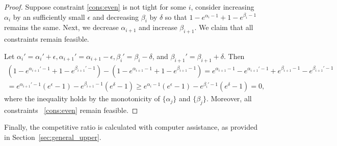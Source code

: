 \begin{proof}
Suppose constraint \eqref{cons:even} is not tight for some $i$, consider increasing $\alpha_i$ by an sufficiently small $\epsilon$ and decreasing $\beta_i$ by $\delta$ so that 
$1-e^{\alpha_i-1} + 1-e^{\beta_i-1}$ remains the same. Next, we decrease $\alpha_{i+1}$ and increase $\beta_{i+1}$. We claim that all constraints remain feasible.

Let $\alpha_i' = \alpha_i' + \epsilon, \alpha_{i+1}' = \alpha_{i+1} - \epsilon, \beta_i'=\beta_i - \delta$, and $\beta_{i+1}' = \beta_{i+1} + \delta$.
Then 
\begin{multline*}
\left(1-e^{\alpha_{i+1}'-1} + 1-e^{\beta_{i+1}'-1} \right) - \left(1-e^{\alpha_{i+1}-1} + 1-e^{\beta_{i+1}-1} \right) = e^{\alpha_{i+1}-1}-e^{\alpha_{i+1}'-1} + e^{\beta_{i+1}-1} - e^{\beta_{i+1}'-1} \\
= e^{\alpha_{i+1}' -1} (e^{\epsilon} - 1)  - e^{\beta_{i+1}-1}(e^{\delta} -1) \ge e^{\alpha_i -1} (e^{\epsilon} - 1)  - e^{\beta_i'-1}(e^{\delta} -1) = 0,
\end{multline*}
where the inequality holds by the monotonicity of $\{\alpha_j\}$ and $\{\beta_j\}$. Moreover, all constraints ~\eqref{cons:even} remain feasible.
\end{proof}

Finally, the competitive ratio is calculated with computer assistance, as provided in Section~\ref{sec:general_upper}.
